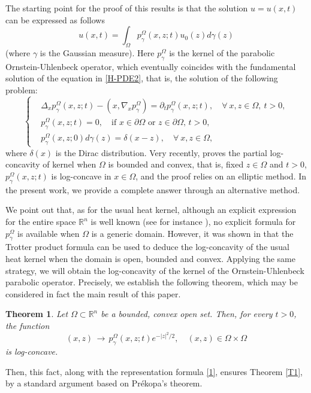 \documentclass[12pt]{amsart}
\newtheorem{theorem}{Theorem}[section]
\newcommand{\R}{\mathbb R}
\newcommand{\1}{\mathbf 1}
\begin{document}
The starting point for the proof of this results is that the solution $u=u(x,t)$ can be expressed as follows
\begin{equation}\label{1}
u(x,t)= \int_{\Omega}p_{\gamma}^{\Omega} (x,z;t)u_0(z) d\gamma(z)
\end{equation}
(where $\gamma$ is the Gaussian measure). Here $p_\gamma^\Omega$ is the kernel of the parabolic Ornstein-Uhlenbeck operator, which eventually coincides with the fundamental solution of the equation in \eqref{H-PDE2}, that is, the solution of the following problem:
\begin{equation}\label{parabolic-equation1}
\left\{
\begin{aligned}
& \Delta_x p_\gamma^\Omega(x,z;t)-(x,\nabla_x p_\gamma^\Omega) =\partial_t p_\gamma^\Omega(x,z;t), \quad\forall\ x,z\in\Omega, \ t>0,  \\
& p_\gamma^\Omega(x,z;t)=0, \quad\mbox{if $x\in\partial\Omega$ or $z\in\partial\Omega$, $t>0$},  \\
& p_\gamma^\Omega(x,z;0)d\gamma(z)=\delta(x-z),  \quad  \forall\ x,z\in\Omega,
\end{aligned}
\right.
\end{equation}
where $\delta(x)$ is the Dirac distribution. Very recently, \cite{SUN-Wang2025} proves the partial log-concavity of kernel when $\Omega$ is bounded and convex, that is, fixed $z\in \Omega$ and $t>0$, $p^\Omega_\gamma (x,z;t)$ is log-concave in $x\in \Omega$, and the proof relies on an elliptic method. In the present work, we provide a complete answer through an alternative method.

We point out that, as for the usual heat kernel, although an explicit expression for the entire space $\R^n$ is well known (see for instance \cite{Book-Markov-Diffu,Evans}),
 no explicit formula for $p_\gamma^\Omega$ is available when $\Omega$ is a generic domain.
However, it was shown in \cite{BL76} that the Trotter product formula can be used to deduce the log-concavity of the usual heat kernel when the domain is open, bounded and convex. Applying the same strategy, we will obtain the log-concavity of the kernel of the Ornstein-Uhlenbeck parabolic operator. Precisely, we establish the following theorem, which may be considered in fact the main result of this paper.
\begin{theorem}\label{Lemma-1}
Let $\Omega\subset \R^n$ be a bounded, convex open set. Then, for every $t>0$, the function
$$
(x,z)\, \rightarrow\,p^\Omega_\gamma (x,z;t) e^{-|z|^2/2},\quad(x,z)\in\Omega\times\Omega
$$
is log-concave.
\end{theorem}
Then, this fact, along with the representation formula \eqref{1}, ensures Theorem \ref{T1}, by a standard argument based on Pr\'ekopa's theorem.
\end{document}
